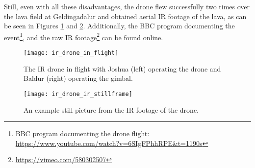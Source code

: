 Still, even with all these disadvantages, the drone flew successfully two times
over the lava field at Geldingadalur and obtained aerial IR footage of the lava,
as can be seen in Figures \ref{figure:ir_drone_in_flight} and \ref{figure:ir_drone_ir_still}.
Additionally, the BBC program documenting the event\footnote{BBC program documenting the drone flight: \url{https://www.youtube.com/watch?v=6SIgFPhhRPE&t=1190s}}, and the raw IR footage\footnote{\url{https://vimeo.com/580302507}} can be found online.

\begin{figure}
    \centering
    \texttt{[image: ir\_drone\_in\_flight]}
    \caption{The IR drone in flight with Joshua (left) operating the drone and Baldur (right) operating the gimbal.}
    \label{figure:ir_drone_in_flight}
\end{figure}

\begin{figure}
    \centering
    \texttt{[image: ir\_drone\_ir\_stillframe]}
    \caption{An example still picture from the IR footage of the drone.}
    \label{figure:ir_drone_ir_still}
\end{figure}